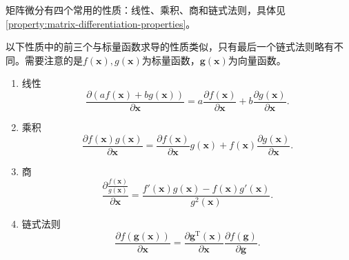矩阵微分有四个常用的性质：线性、乘积、商和链式法则，具体见\cref{property:matrix-differentiation-properties}。

\begin{property}[矩阵微分的四个性质] \label{property:matrix-differentiation-properties}
    以下性质中的前三个与标量函数求导的性质类似，只有最后一个链式法则略有不同。需要注意的是\( f(\bm{x}), g(\bm{x}) \)为标量函数，\( \bm{g}(\bm{x}) \)为向量函数。
    \begin{enumerate}
        \item 线性
              \begin{equation}
                  \frac{\partial(af(\bm{x})+bg(\bm{x}))}{\partial \bm{x}}=a\frac{\partial f(\bm{x})}{\partial \bm{x}}+b\frac{\partial g(\bm{x})}{\partial \bm{x}}.
              \end{equation}
        \item 乘积
              \begin{equation}
                  \frac{\partial f(\bm{x})g(\bm{x})}{\partial \bm{x}}=\frac{\partial f(\bm{x})}{\partial \bm{x}}g(\bm{x})+f(\bm{x})\frac{\partial g(\bm{x})}{\partial \bm{x}}.
              \end{equation}
        \item 商
              \begin{equation}
                  \frac{\partial \frac{f(\bm{x})}{g(\bm{x})}}{\partial \bm{x}}=\frac{f'(\bm{x})g(\bm{x})-f(\bm{x})g'(\bm{x})}{g^2(\bm{x})}.
              \end{equation}
        \item 链式法则
              \begin{equation}
                  \frac{\partial f(\mathbf{g}(\bm{x}))}{\partial \bm{x}}=\frac{\partial \mathbf{g}^{\mathrm{T}}(\bm{x})}{\partial \bm{x}}\frac{\partial f(\mathbf{g})}{\partial \mathbf{g}}.
              \end{equation}
    \end{enumerate}
\end{property}


